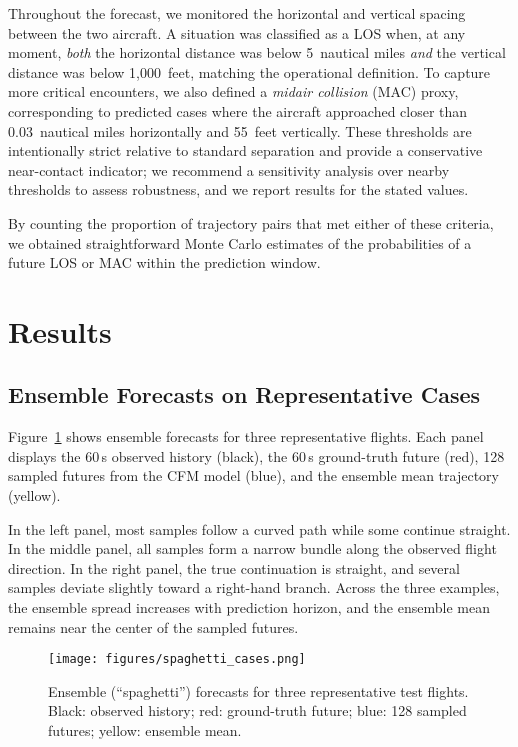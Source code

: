 \documentclass[
  manuscript=proceedings,  %
  layout=preprint,  %
  year=20xx,
  volume=x,
]{extra/joas}
\begin{document}
Throughout the forecast, we monitored the horizontal and vertical spacing between the two aircraft. 
A situation was classified as a LOS when, at any moment, \emph{both} the horizontal distance was below 5~nautical miles \emph{and} the vertical distance was below 1,000~feet, matching the operational definition. 
To capture more critical encounters, we also defined a \textit{midair collision} (MAC) proxy, corresponding to predicted cases where the aircraft approached closer than 0.03~nautical miles horizontally and 55~feet vertically. These thresholds are intentionally strict relative to standard separation and provide a conservative near-contact indicator; we recommend a sensitivity analysis over nearby thresholds to assess robustness, and we report results for the stated values.

By counting the proportion of trajectory pairs that met either of these criteria, we obtained straightforward Monte Carlo estimates of the probabilities of a future LOS or MAC within the prediction window.

\section{Results}

\subsection{Ensemble Forecasts on Representative Cases}
\label{subsec:spaghetti}

Figure~\ref{fig:spaghetti_cases} shows ensemble forecasts for three representative flights.
Each panel displays the 60\,s observed history (black), the 60\,s ground-truth future (red), 128 sampled futures from the CFM model (blue), and the ensemble mean trajectory (yellow).

In the left panel, most samples follow a curved path while some continue straight.
In the middle panel, all samples form a narrow bundle along the observed flight direction.
In the right panel, the true continuation is straight, and several samples deviate slightly toward a right-hand branch.
Across the three examples, the ensemble spread increases with prediction horizon, and the ensemble mean remains near the center of the sampled futures.

\begin{figure}[hbt]
\centering
\texttt{[image: figures/spaghetti\_cases.png]}
\caption{Ensemble (“spaghetti”) forecasts for three representative test flights.
Black: observed history; red: ground-truth future; blue: 128 sampled futures; yellow: ensemble mean.}
\label{fig:spaghetti_cases}
\end{figure}
\end{document}
